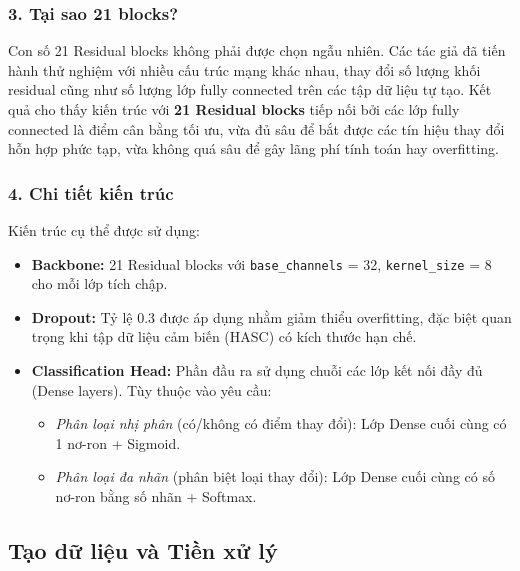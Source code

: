 \subsubsection*{3. Tại sao 21 blocks?}
Con số 21 Residual blocks không phải được chọn ngẫu nhiên. 
Các tác giả đã tiến hành thử nghiệm với nhiều cấu trúc mạng khác nhau, 
thay đổi số lượng khối residual cũng như số lượng lớp fully connected trên các tập dữ liệu tự tạo. 
Kết quả cho thấy kiến trúc với \textbf{21 Residual blocks} tiếp nối bởi các lớp fully connected 
là điểm cân bằng tối ưu, vừa đủ sâu để bắt được các tín hiệu thay đổi hỗn hợp phức tạp, 
vừa không quá sâu để gây lãng phí tính toán hay overfitting.

\subsubsection*{4. Chi tiết kiến trúc}
Kiến trúc cụ thể được sử dụng:
\begin{itemize}
    \item \textbf{Backbone:} 21 Residual blocks với \texttt{base\_channels} = 32, \texttt{kernel\_size} = 8 cho mỗi lớp tích chập.
    \item \textbf{Dropout:} Tỷ lệ 0.3 được áp dụng nhằm giảm thiểu overfitting, đặc biệt quan trọng khi tập dữ liệu cảm biến (HASC) có kích thước hạn chế.
    \item \textbf{Classification Head:} Phần đầu ra sử dụng chuỗi các lớp kết nối đầy đủ (Dense layers). Tùy thuộc vào yêu cầu:
    \begin{itemize}
        \item \textit{Phân loại nhị phân} (có/không có điểm thay đổi): Lớp Dense cuối cùng có 1 nơ-ron + Sigmoid.
        \item \textit{Phân loại đa nhãn} (phân biệt loại thay đổi): Lớp Dense cuối cùng có số nơ-ron bằng số nhãn + Softmax.
    \end{itemize}
\end{itemize}

\subsection{Tạo dữ liệu và Tiền xử lý}

